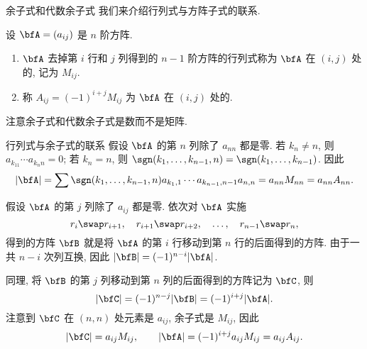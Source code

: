 \begin{frame}{余子式和代数余子式}
	\onslide<+->
	我们来介绍行列式与方阵子式的联系.
	\onslide<+->
	\begin{definition}
		设 $\bfA=(a_{ij})$ 是 $n$ 阶方阵.
		\begin{enumerate}
			\item $\bfA$ 去掉第 $i$ 行和 $j$ 列得到的 $n-1$ 阶方阵的行列式称为 $\bfA$ 在 $(i,j)$ 处的\emph{}, 记为 $M_{ij}$.
			\item 称 $A_{ij}=(-1)^{i+j}M_{ij}$ 为 $\bfA$ 在 $(i,j)$ 处的\emph{}.
		\end{enumerate}
	\end{definition}
	\onslide<+->
	注意余子式和代数余子式是数而不是矩阵.
\end{frame}


\begin{frame}{行列式与余子式的联系}
	\onslide<+->
	假设 $\bfA$ 的第 $n$ 列除了 $a_{nn}$ 都是零.
	\onslide<+->
	若 $k_n\neq n$, 则 $a_{k_11}\cdots a_{k_nn}=0$; 若 $k_n=n$, 则 $\sgn(k_1,\dots,k_{n-1},n)=\sgn(k_1,\dots,k_{n-1})$.
	\onslide<+->
	因此
	\[|\bfA|=\sum \sgn(k_1,\dots,k_{n-1},n)a_{k_1,1}\cdots a_{k_{n-1},n-1}a_{n,n}=a_{nn} M_{nn}=a_{nn} A_{nn}.\]

	\onslide<+->
	假设 $\bfA$ 的第 $j$ 列除了 $a_{ij}$ 都是零.
	\onslide<+->
	依次对 $\bfA$ 实施
	\[r_i\swap r_{i+1},\quad r_{i+1}\swap r_{i+2},\quad\dots,\quad r_{n-1}\swap r_n,\]
	得到的方阵 $\bfB$ 就是将 $\bfA$ 的第 $i$ 行移动到第 $n$ 行的后面得到的方阵.
	\onslide<+->
	由于一共 $n-i$ 次列互换, 因此 $|\bfB|=(-1)^{n-i}|\bfA|$.

	\onslide<+->
	同理, 将 $\bfB$ 的第 $j$ 列移动到第 $n$ 列的后面得到的方阵记为 $\bfC$, 则
	\[|\bfC|=(-1)^{n-j}|\bfB|=(-1)^{i+j}|\bfA|.\]
	\onslide<+->
	注意到 $\bfC$ 在 $(n,n)$ 处元素是 $a_{ij}$, 余子式是 $M_{ij}$,
	\onslide<+->
	因此
	\[|\bfC|=a_{ij}M_{ij},\qquad |\bfA|=(-1)^{i+j}a_{ij}M_{ij}=a_{ij}A_{ij}.\]
\end{frame}


